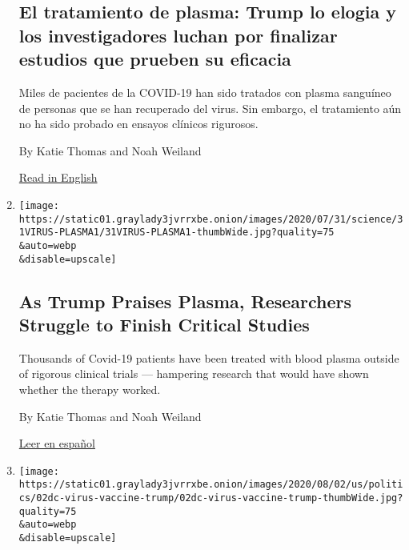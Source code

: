 \begin{enumerate}
  \hypertarget{el-tratamiento-de-plasma-trump-lo-elogia-y-los-investigadores-luchan-por-finalizar-estudios-que-prueben-su-eficacia}{%
  \subsection{El tratamiento de plasma: Trump lo elogia y los
  investigadores luchan por finalizar estudios que prueben su
  eficacia}\label{el-tratamiento-de-plasma-trump-lo-elogia-y-los-investigadores-luchan-por-finalizar-estudios-que-prueben-su-eficacia}}

  Miles de pacientes de la COVID-19 han sido tratados con plasma
  sanguíneo de personas que se han recuperado del virus. Sin embargo, el
  tratamiento aún no ha sido probado en ensayos clínicos rigurosos.

  By Katie Thomas and Noah Weiland

  \href{https://www.nytimes3xbfgragh.onion/2020/08/04/health/trump-plasma.html}{Read
  in English}
\item
  \href{/2020/08/04/health/trump-plasma.html}{}

  \texttt{[image: https://static01.graylady3jvrrxbe.onion/images/2020/07/31/science/31VIRUS-PLASMA1/31VIRUS-PLASMA1-thumbWide.jpg?quality=75\\\&auto=webp\\\&disable=upscale]}

  \hypertarget{as-trump-praises-plasma-researchers-struggle-to-finish-critical-studies}{%
  \subsection{As Trump Praises Plasma, Researchers Struggle to Finish
  Critical
  Studies}\label{as-trump-praises-plasma-researchers-struggle-to-finish-critical-studies}}

  Thousands of Covid-19 patients have been treated with blood plasma
  outside of rigorous clinical trials --- hampering research that would
  have shown whether the therapy worked.

  By Katie Thomas and Noah Weiland

  \href{https://www.nytimes3xbfgragh.onion/es/2020/08/07/espanol/ciencia-y-tecnologia/plasma-convaleciente-coronavirus.html}{Leer
  en español}
\item
  \href{/2020/08/02/us/politics/coronavirus-vaccine.html}{}

  \texttt{[image: https://static01.graylady3jvrrxbe.onion/images/2020/08/02/us/politics/02dc-virus-vaccine-trump/02dc-virus-vaccine-trump-thumbWide.jpg?quality=75\\\&auto=webp\\\&disable=upscale]}


\end{enumerate}
